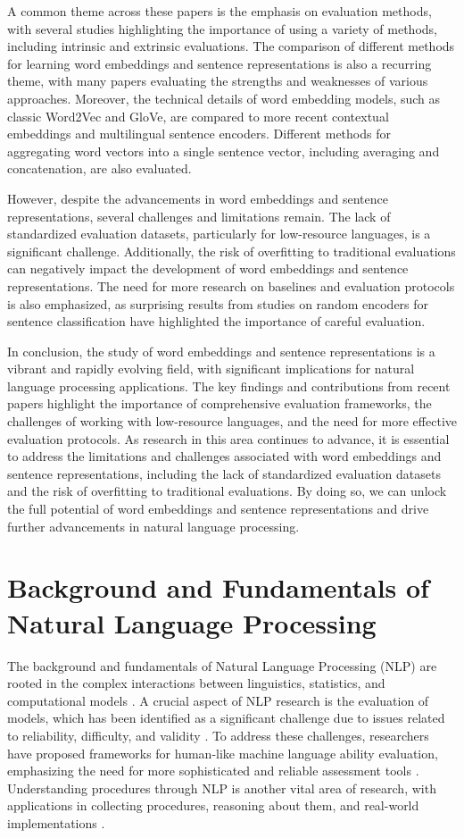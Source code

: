\documentclass[conference]{IEEEtran}
\begin{document}
A common theme across these papers is the emphasis on evaluation methods, with several studies highlighting the importance of using a variety of methods, including intrinsic and extrinsic evaluations. The comparison of different methods for learning word embeddings and sentence representations is also a recurring theme, with many papers evaluating the strengths and weaknesses of various approaches. Moreover, the technical details of word embedding models, such as classic Word2Vec and GloVe, are compared to more recent contextual embeddings and multilingual sentence encoders. Different methods for aggregating word vectors into a single sentence vector, including averaging and concatenation, are also evaluated.

However, despite the advancements in word embeddings and sentence representations, several challenges and limitations remain. The lack of standardized evaluation datasets, particularly for low-resource languages, is a significant challenge. Additionally, the risk of overfitting to traditional evaluations can negatively impact the development of word embeddings and sentence representations. The need for more research on baselines and evaluation protocols is also emphasized, as surprising results from studies on random encoders for sentence classification have highlighted the importance of careful evaluation.

In conclusion, the study of word embeddings and sentence representations is a vibrant and rapidly evolving field, with significant implications for natural language processing applications. The key findings and contributions from recent papers highlight the importance of comprehensive evaluation frameworks, the challenges of working with low-resource languages, and the need for more effective evaluation protocols. As research in this area continues to advance, it is essential to address the limitations and challenges associated with word embeddings and sentence representations, including the lack of standardized evaluation datasets and the risk of overfitting to traditional evaluations. By doing so, we can unlock the full potential of word embeddings and sentence representations and drive further advancements in natural language processing.

\section{Background and Fundamentals of Natural Language Processing}
The background and fundamentals of Natural Language Processing (NLP) are rooted in the complex interactions between linguistics, statistics, and computational models \cite{b1}. A crucial aspect of NLP research is the evaluation of models, which has been identified as a significant challenge due to issues related to reliability, difficulty, and validity \cite{b2}. To address these challenges, researchers have proposed frameworks for human-like machine language ability evaluation, emphasizing the need for more sophisticated and reliable assessment tools \cite{b2}. Understanding procedures through NLP is another vital area of research, with applications in collecting procedures, reasoning about them, and real-world implementations \cite{b3}.
\end{document}
